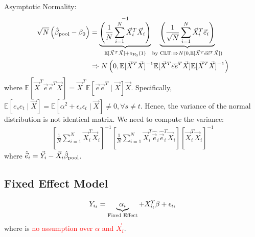 \documentclass[11pt]{elegantbook}
\begin{document}
Asymptotic Normality:
\begin{equation}
    \begin{aligned}
        \sqrt{N}\left(\hat{\beta}_\textnormal{pool}-\beta_0\right)&=\underbrace{\left(\frac{1}{N}\sum_{i=1}^N \vec{X}_i^T \vec{X}_i\right)}_{\mathbb{E}[\vec{X}^T \vec{X}]+o_{P_0}(1)}^{-1}\underbrace{\left(\frac{1}{\sqrt{N}}\sum_{i=1}^N \vec{X}_i^T \vec{e}_i\right)}_{\textnormal{by CLT:} \Rightarrow N(0,\mathbb{E}[\vec{X}^T \vec{e}\vec{e}^T \vec{X}])}\\
        & \Rightarrow N\left(0,\mathbb{E}[\vec{X}^T \vec{X}]^{-1}\mathbb{E}[\vec{X}^T \vec{e}\vec{e}^T \vec{X}]\mathbb{E}[\vec{X}^T \vec{X}]^{-1}\right)
    \end{aligned}
    \nonumber
\end{equation}
where $\mathbb{E}[\vec{X}^T \vec{e}\vec{e}^T \vec{X}]=\vec{X}^T \mathbb{E}[\vec{e}\vec{e}^T\mid\vec{X}]\vec{X}$. Specifically, $\mathbb{E}[e_se_t\mid \vec{X}]=\mathbb{E}[\alpha^2+\epsilon_s\epsilon_t\mid \vec{X}]\neq 0, \forall s\neq t$. Hence, the variance of the normal distribution is not identical matrix. We need to compute the variance:
\begin{equation}
    \begin{aligned}
        [\frac{1}{N}\sum_{i=1}^N\vec{X}_i^T \vec{X}_i]^{-1}[\frac{1}{N}\sum_{i=1}^N\vec{X}_i^T \hat{\vec{e}}_i\hat{\vec{e}}_i^T \vec{X}_i][\vec{X}_i^T \vec{X}_i]^{-1}
    \end{aligned}
    \nonumber
\end{equation}
where $\hat{\vec{e}}_i=\vec{Y}_i-\vec{X}_i\hat{\beta}_\textnormal{pool}$.

\subsection{Fixed Effect Model}
\begin{equation}
    \begin{aligned}
        Y_{i_t}=\underbrace{\alpha_i}_\textnormal{Fixed Effect}+X_{i_t}^T\beta+\epsilon_{i_t}
    \end{aligned}
    \nonumber
\end{equation}
where is \textcolor{red}{no assumption over $\alpha$ and $\vec{X}_i$}.
\end{document}
